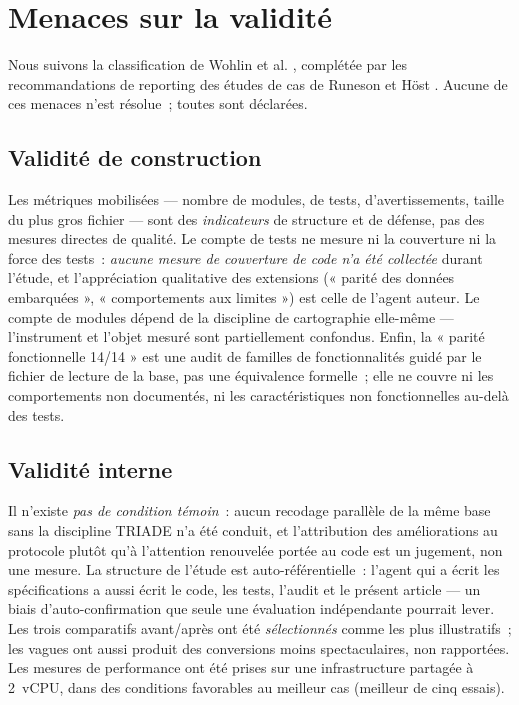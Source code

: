 \section{Menaces sur la validité}\label{sec:menaces}

Nous suivons la classification de Wohlin et al. \cite{wohlin2012},
complétée par les recommandations de reporting des études de cas de
Runeson et H{\"o}st \cite{runeson2009}. Aucune de ces menaces n’est
résolue~; toutes sont déclarées.

\subsection{Validité de construction}\label{sec:construction}

Les métriques mobilisées — nombre de modules, de tests, d’avertissements,
taille du plus gros fichier — sont des \emph{indicateurs} de structure et
de défense, pas des mesures directes de qualité. Le compte de tests ne
mesure ni la couverture ni la force des tests~: \emph{aucune mesure de
couverture de code n’a été collectée} durant l’étude, et l’appréciation
qualitative des extensions (« parité des données embarquées »,
« comportements aux limites ») est celle de l’agent auteur. Le compte de
modules dépend de la discipline de cartographie elle-même — l’instrument
et l’objet mesuré sont partiellement confondus. Enfin, la « parité
fonctionnelle 14/14 » est une audit de familles de fonctionnalités guidé
par le fichier de lecture de la base, pas une équivalence formelle~; elle
ne couvre ni les comportements non documentés, ni les caractéristiques non
fonctionnelles au-delà des tests.

\subsection{Validité interne}\label{sec:interne}

Il n’existe \emph{pas de condition témoin}~: aucun recodage parallèle de la
même base sans la discipline TRIADE n’a été conduit, et l’attribution des
améliorations au protocole plutôt qu’à l’attention renouvelée portée au
code est un jugement, non une mesure. La structure de l’étude est
auto-référentielle~: l’agent qui a écrit les spécifications a aussi écrit
le code, les tests, l’audit et le présent article — un biais
d’auto-confirmation que seule une évaluation indépendante pourrait
lever. Les trois comparatifs avant/après ont été \emph{sélectionnés}
comme les plus illustratifs~; les vagues ont aussi produit des
conversions moins spectaculaires, non rapportées. Les mesures de
performance ont été prises sur une infrastructure partagée à 2~vCPU, dans
des conditions favorables au meilleur cas (meilleur de cinq essais).

